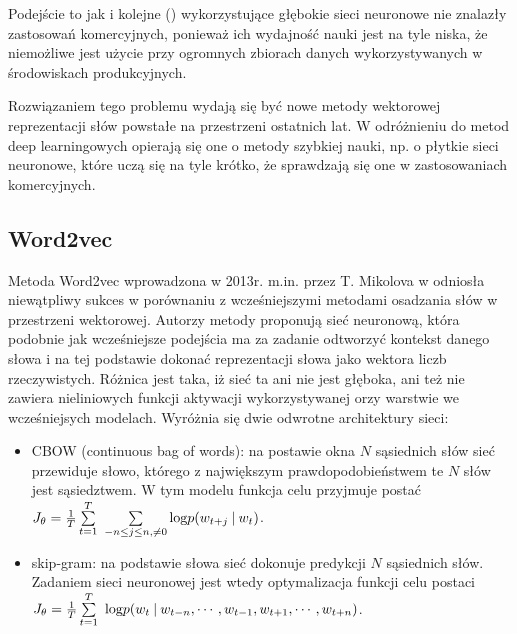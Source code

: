 \documentclass[pl]{minipw} %
\begin{document}
Podejście to jak i kolejne (\cite{c_w}) wykorzystujące głębokie sieci neuronowe nie znalazły zastosowań komercyjnych, ponieważ ich wydajność nauki jest na tyle  niska, że niemożliwe jest użycie przy ogromnych zbiorach danych wykorzystywanych w środowiskach produkcyjnych.


Rozwiązaniem tego problemu wydają się być nowe metody wektorowej reprezentacji słów powstałe na przestrzeni ostatnich lat. W odróżnieniu do metod deep learningowych opierają się one o metody szybkiej nauki, np. o płytkie sieci neuronowe, które uczą się na tyle krótko, że sprawdzają się one w zastosowaniach komercyjnych.


\subsection{Word2vec}%

Metoda Word2vec wprowadzona w 2013r. m.in. przez T. Mikolova w \cite{word2vec} odniosła niewątpliwy sukces w porównaniu z wcześniejszymi metodami osadzania słów w przestrzeni wektorowej. Autorzy metody proponują sieć neuronową, która podobnie jak wcześniejsze podejścia ma za zadanie odtworzyć kontekst danego słowa i na tej podstawie dokonać reprezentacji słowa jako wektora liczb rzeczywistych. Różnica jest taka, iż sieć ta ani nie jest głęboka, ani też nie zawiera nieliniowych funkcji aktywacji wykorzystywanej orzy warstwie we wcześniejsych modelach. Wyróżnia się dwie odwrotne architektury sieci:
\begin{itemize}
	\item CBOW (continuous bag of words): na postawie okna $N$ sąsiednich słów sieć przewiduje słowo, którego z największym prawdopodobieństwem te $N$ słów jest sąsiedztwem. W tym modelu funkcja celu przyjmuje postać $J_\theta = \frac{1}{T}\sum\limits_{t=1}^T\ \sum\limits_{-n \leq j \leq n , \neq 0} \text{log} \space p(w_{t+j} \: | \: w_t)$.
	\item skip-gram: na podstawie słowa sieć dokonuje predykcji $N$ sąsiednich słów. Zadaniem sieci neuronowej jest wtedy optymalizacja funkcji celu postaci $J_\theta = \frac{1}{T}\sum\limits_{t=1}^T\ \text{log} \space p(w_t \: | \: w_{t-n} , \cdots , w_{t-1}, w_{t+1}, \cdots , w_{t+n})$.
\end{itemize}
\end{document}
